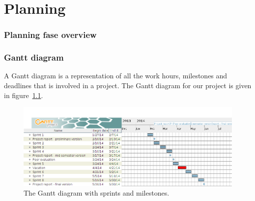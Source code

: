 \chapter{Planning}

\subsection{Planning fase overview}

\newpage


\newpage
\subsection{Gantt diagram}

A Gantt diagram is a representation of all the work hours, milestones and deadlines that is involved in a project. The Gantt diagram for our project is given in figure~\ref{fig:gantt}.

\begin{figure}[H]
\includegraphics[width=\textwidth]{ch/planning/fig/gantt.png}
\caption{The Gantt diagram with sprints and milestones.}
\label{fig:gantt}
\end{figure}






%
